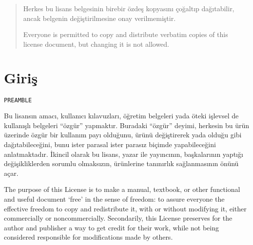 \def\lisansbicim{
        \renewcommand{\thesection}
        {\arabic{subsection}}\let\section\subsection%
        \multicolsep=1.5pc}

\begin{multicols}{2}\small\lisansstil
\begin{quotation}\small\begingroup 

Herkes bu lisans belgesinin birebir özdeş kopyasını çoğaltıp dağıtabilir,
ancak belgenin değiştirilmesine onay verilmemiştir.

\begin{ingliz}
Everyone is permitted to copy and distribute verbatim copies
of this license document, but changing it is not allowed.
\end{ingliz}

\par\endgroup\smallskip\footnotesize\noindent
\end{quotation}
\setcounter{section}{-1}
\section{Giriş}\hfill\begin{verbatim}PREAMBLE\end{verbatim}
\label{gfdl-0}
Bu lisansın amacı, kullanıcı kılavuzları, öğretim belgeleri yada öteki işlevsel de kullanışlı belgeleri ``özgür'' yapmaktır. Buradaki ``özgür'' deyimi, herkesin bu ürün üzerinde özgür bir kullanım payı olduğunu, ürünü değiştirerek yada olduğu gibi dağıtabileceğini, bunu ister parasal ister parasız biçimde yapabileceğini anlatmaktadır. İkincil olarak bu lisans, yazar ile yayıncının, başkalarının yaptığı değişikliklerden sorumlu olmaksızın, ürünlerine tanınırlık sağlanmasının önünü açar.

\begin{ingliz}
The purpose of this License is to make a manual, textbook,
or other functional and useful document `free' in
the sense of freedom: to assure everyone the effective freedom
to copy and redistribute it, with or without modifying it,
either commercially or noncommercially. Secondarily, this
License preserves for the author and publisher a way to get
credit for their work, while not being considered responsible
for modifications made by others.
\end{ingliz}


\end{multicols}
